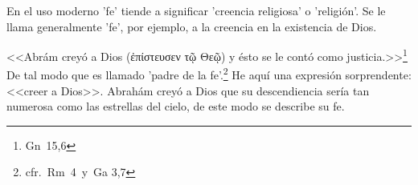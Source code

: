 En el uso moderno 'fe' tiende a significar 'creencia religiosa' o 'religión'. Se le llama generalmente 'fe', por ejemplo, a la creencia en la existencia de Dios. 

<<Abrám creyó a Dios (\textgreek{ἐπίστευσεν τῷ Θεῷ}) y ésto se le contó como justicia.>>\footnote{Gn~15,6} De tal modo que es llamado 'padre de la fe'.\footnote{cfr.~Rm~4~y~Ga 3,7} He aquí una expresión sorprendente: <<creer a Dios>>. Abrahám creyó a Dios que su descendiencia sería tan numerosa como las estrellas del cielo, de este modo se describe su fe.
